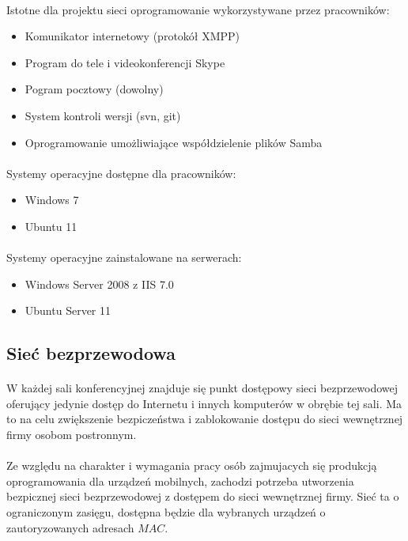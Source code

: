 \paragraph{}
Istotne dla projektu sieci oprogramowanie wykorzystywane przez pracowników:
\begin{itemize}
  \item Komunikator internetowy (protokół XMPP)
  \item Program do tele i videokonferencji Skype
  \item Pogram pocztowy (dowolny)
  \item System kontroli wersji (svn, git)
  \item Oprogramowanie umożliwiające współdzielenie plików Samba
\end{itemize}

\paragraph{}
Systemy operacyjne dostępne dla pracowników:
\begin{itemize}
  \item Windows 7
  \item Ubuntu 11
\end{itemize}

\paragraph{}
Systemy operacyjne zainstalowane na serwerach:
\begin{itemize}
  \item Windows Server 2008 z IIS 7.0
  \item Ubuntu Server 11
\end{itemize}


\subsection{Sieć bezprzewodowa}
\paragraph{}
W każdej sali konferencyjnej znajduje się punkt dostępowy sieci bezprzewodowej oferujący jedynie dostęp do Internetu i innych komputerów w obrębie tej sali. Ma to na celu zwiększenie bezpiczeństwa i zablokowanie dostępu do sieci wewnętrznej firmy osobom postronnym.
\paragraph{}
Ze względu na charakter i wymagania pracy osób zajmujacych się produkcją oprogramowania dla urządzeń mobilnych, zachodzi potrzeba utworzenia bezpicznej sieci bezprzewodowej z dostępem do sieci wewnętrznej firmy. Sieć ta o ograniczonym zasięgu, dostępna będzie dla wybranych urządzeń o zautoryzowanych adresach $MAC$.

